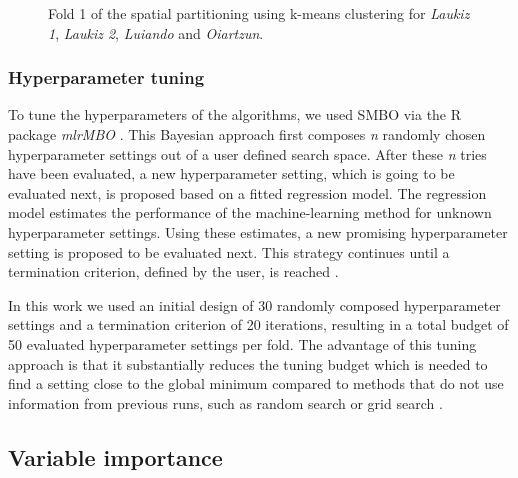 \documentclass[review]{elsarticle}
\begin{document}
\begin{figure} [t!]
	\begin{center}
		\caption{Fold 1 of the spatial partitioning using k-means clustering for \textit{Laukiz 1}, \textit{Laukiz 2}, \textit{Luiando} and \textit{Oiartzun}.}
		\label{fig:spcv}
	\end{center}
\end{figure}

\subsubsection{Hyperparameter tuning}
\label{meth:smbo}

\noindent To tune the hyperparameters of the algorithms, we used \ac{SMBO} via the R package \textit{mlrMBO} \citep{mlrMBO}.
This Bayesian approach first composes \textit{n} randomly chosen hyperparameter settings out of a user defined search space.
After these \textit{n} tries have been evaluated, a new hyperparameter setting, which is going to be evaluated next, is proposed based on a fitted regression model.
The regression model estimates the performance of the machine-learning method for unknown hyperparameter settings.
Using these estimates, a new promising hyperparameter setting is proposed to be evaluated next.
This strategy continues until a termination criterion, defined by the user, is reached \citep{Hutter2011, Jones1998}.

In this work we used an initial design of 30 randomly composed hyperparameter settings and a termination criterion of 20 iterations, resulting in a total budget of 50 evaluated hyperparameter settings per fold.
The advantage of this tuning approach is that it substantially reduces the tuning budget which is needed to find a setting close to the global minimum compared to methods that do not use information from previous runs, such as random search or grid search \citep{Bergstra2012}.

\subsection{Variable importance}
\end{document}
